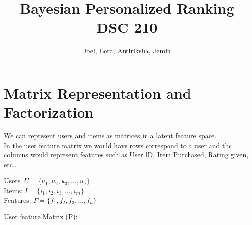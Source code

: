 \documentclass{article}
\title{Bayesian Personalized Ranking \\
DSC 210 
}
\author{Joel, Lora, Antiriksha, Jemin}
\begin{document}
\maketitle

\section{Matrix Representation and Factorization}
We can represent users and items as matrices in a latent feature space.\\
In the user feature matrix we would have rows correspond to a user and the columns would represent features such as User ID, Item Purchased, Rating given, etc.. 
\begin{center}
Users: $U = \{u_1, u_2, u_3,..., u_n\}$\\
Items: $I = \{i_1, i_2, i_3,..., i_m\}$ \\
Features: $F = \{f_1, f_2, f_3, ..., f_n\}$
\end{center}
User feature Matrix (P): \\
\end{document}
